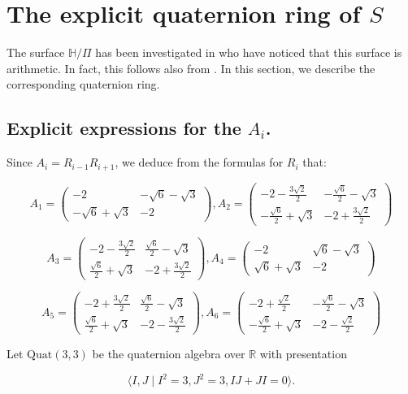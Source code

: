 \documentclass[10pt,a4paper]{amsart}
\newcommand{\HP}{\mathbb{H}}
\newcommand{\R}{\mathbb{R}}
\newcommand{\Quat}{{\mathrm {Quat}}}
\begin{document}
\section{The explicit quaternion ring of $S$}

The surface $\HP/\Pi$ has been investigated 
in \cite{KuuNaa} who have noticed that this surface is arithmetic. In fact, this follows also from
\cite{Takeuchi}. In this section, we describe the 
corresponding quaternion ring.


\subsection{Explicit expressions for the $A_i$.}

Since $A_i=R_{i-1}R_{i+1}$, we deduce from the
formulas for $R_i$ that:

$$A_1=\begin{pmatrix}
-2 &-\sqrt{6}-\sqrt{3}\\
-\sqrt{6}+\sqrt{3}&-2
\end{pmatrix},
A_2=\begin{pmatrix}
-2-\frac{3\sqrt{2}}{2}&-\frac{\sqrt{6}}{2}-\sqrt{3}\\
-\frac{\sqrt{6}}{2}+\sqrt{3}&-2+\frac{3\sqrt{2}}{2}\end{pmatrix}$$

$$A_3=\begin{pmatrix}
-2-\frac{3\sqrt{2}}{2}&\frac{\sqrt{6}}{2}-\sqrt{3}\\
\frac{\sqrt{6}}{2}+\sqrt{3}&-2+\frac{3\sqrt{2}}{2}\end{pmatrix},
A_4=\begin{pmatrix}
-2 &\sqrt{6}-\sqrt{3}\\
\sqrt{6}+\sqrt{3}&-2
\end{pmatrix}$$


$$A_5=\begin{pmatrix}
-2+\frac{3\sqrt{2}}{2}&\frac{\sqrt{6}}{2}-\sqrt{3}\\
\frac{\sqrt{6}}{2}+\sqrt{3}&-2-\frac{3\sqrt{2}}{2}\end{pmatrix},
A_6=\begin{pmatrix}
-2+\frac{\sqrt{2}}{2} &-\frac{\sqrt{6}}{2}-\sqrt{3}\\
-\frac{\sqrt{6}}{2}+\sqrt{3}&-2-\frac{\sqrt{2}}{2}
\end{pmatrix}$$

Let $\Quat(3,3)$ be the quaternion algebra over $\R$ with presentation

$$\langle I, J\mid I^2=3, J^2=3, IJ+JI=0\rangle.$$
\end{document}
